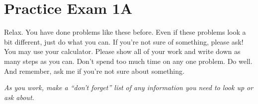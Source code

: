 
\section*{Practice Exam 1A}  

Relax.  You have done problems like these before.  Even if these problems look a bit different, just do what you can.  If you're not sure of something, please ask! You may use your calculator.  Please show all of your work and write down as many steps as you can.  Don't spend too much time on any one problem.  Do well.  And remember, ask me if you're not sure about something. \bigskip

\noindent \emph{As you work, make a ``don't forget'' list of any information you need to look up or ask about.} 

\noindent \hrulefill
\bigskip

